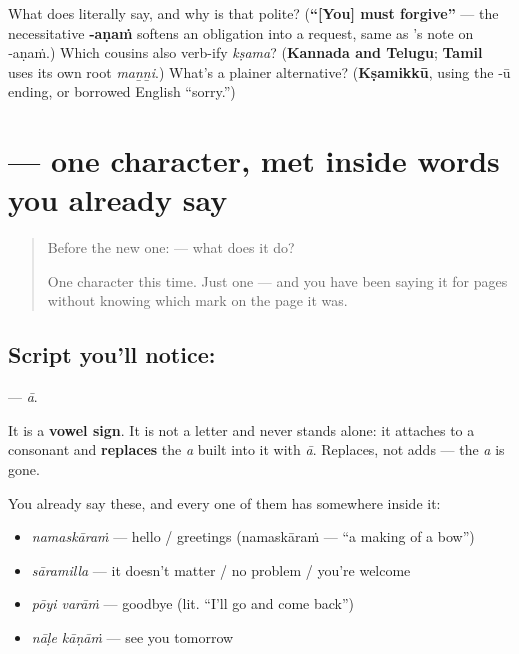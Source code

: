 \begin{tcolorbox}[breakable,colback=teal!4,colframe=teal!35!black,title={Before you move on}]
What does \textbf{} literally say, and why is that polite? (\textbf{\textquotedblleft{}{[}You{]} must forgive\textquotedblright{}} — the necessitative \textbf{‑aṇaṁ} softens an obligation into a request, same as \emph{}'s note on ‑aṇaṁ.) Which cousins also verb-ify \emph{kṣama}? (\textbf{Kannada and Telugu}; \textbf{Tamil} uses its own root \emph{maṉṉi}.) What's a plainer alternative? (\textbf{Kṣamikkū}, using the ‑ū ending, or borrowed English \textquotedblleft{}sorry.\textquotedblright{})
\end{tcolorbox}
\section[\texorpdfstring{\ml{ാ} (ā)}{ാ (ā)}]{ — one character, met inside words you already say}

\label{lesson:ML-S04-vowel-sign-aa}



\begin{quote}
Before the new one:  — what does it do?

One character this time. Just one — and you have been saying it for pages without knowing which mark on the page it was.
\end{quote}

\subsection*{Script you'll notice: }
\textbf{} — \emph{ā}.

It is a \textbf{vowel sign}. It is not a letter and never stands alone: it attaches to a consonant and \textbf{replaces} the \emph{a} built into it with \emph{ā}. Replaces, not adds — the \emph{a} is gone.

You already say these, and every one of them has  somewhere inside it:

\begin{itemize}
\raggedright
  \item \textbf{} \emph{namaskāraṁ} — hello / greetings (namaskāraṁ — \textquotedblleft{}a making of a bow\textquotedblright{})
  \item \textbf{} \emph{sāramilla} — it doesn't matter / no problem / you're welcome
  \item \textbf{ } \emph{pōyi varāṁ} — goodbye (lit. \textquotedblleft{}I'll go and come back\textquotedblright{})
  \item \textbf{ } \emph{nāḷe kāṇāṁ} — see you tomorrow
\end{itemize}

